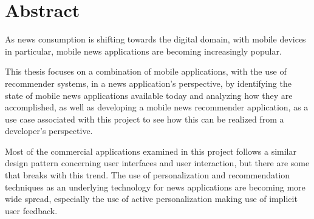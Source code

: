 \chapter*{Abstract}
As news consumption is shifting towards the digital domain, with mobile devices in particular, mobile news applications are becoming increasingly popular.

This thesis focuses on a combination of mobile applications, with the use of recommender systems, in a news application's perspective, by identifying the state of mobile news applications available today and analyzing how they are accomplished, as well as developing a mobile news recommender application, as a use case associated with this project to see how this can be realized from a developer's perspective.

Most of the commercial applications examined in this project follows a similar design pattern concerning user interfaces and user interaction, but there are some that breaks with this trend. The use of personalization and recommendation techniques as an underlying technology for news applications are becoming more wide spread, especially the use of active personalization making use of implicit user feedback.

\clearpage
